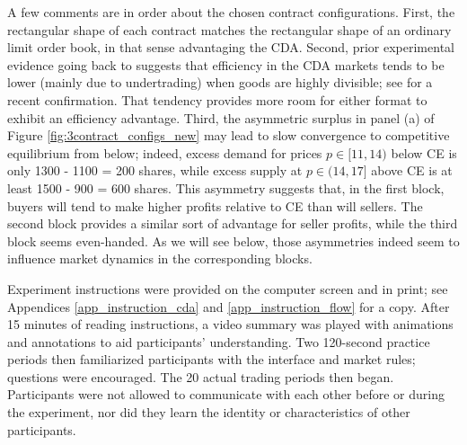 \documentclass[12pt]{article}
\begin{document}


A few comments are in order about the chosen contract configurations. 
First, the rectangular shape of each contract matches the rectangular shape of an ordinary limit order book, in that sense advantaging the CDA. %
Second, prior experimental evidence 
going back to \cite{friedman1995competitivity} suggests that efficiency in the CDA markets tends to be lower (mainly due to undertrading) when goods are highly divisible; see \cite{angereretal}
for a recent confirmation.
That tendency provides more room for either format to exhibit an efficiency advantage.
Third, the asymmetric surplus in panel (a) of Figure \ref{fig:3contract_configs_new} may lead to slow convergence to competitive equilibrium from below; indeed, excess demand for prices $p \in [11,14)$ below CE is only 1300 - 1100 = 200 shares, while excess supply at $p \in (14, 17]$ above CE is at least 1500 - 900 = 600 shares.
This asymmetry suggests that, in the first block, buyers will tend to make higher profits relative to CE than will sellers.
The second block provides a similar sort of advantage for seller profits, while the third block seems even-handed. As we will see below, those asymmetries indeed seem to influence market dynamics in the corresponding blocks. 


Experiment instructions were provided on the computer screen and in print; see Appendices \ref{app_instruction_cda} and \ref{app_instruction_flow} for a copy. %
After 15 minutes of reading instructions, a video summary was played with animations and annotations to aid participants' understanding. 
Two 120-second practice periods then familiarized participants with the interface and market rules; questions
were encouraged. 
The 20 actual trading periods then began.
Participants were not allowed to communicate with each other before or during the experiment, nor did they learn the identity or characteristics of other participants.
\end{document}
